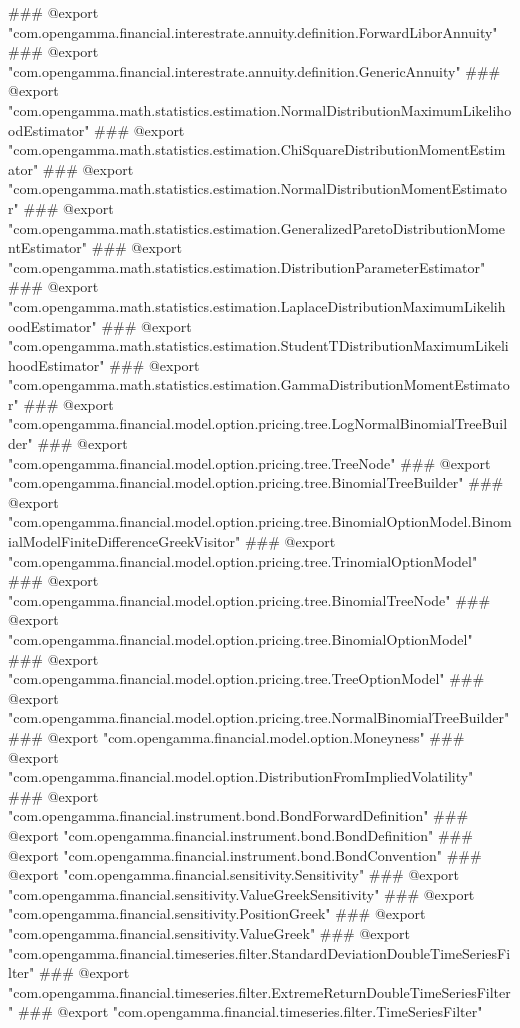 ### @export "com.opengamma.financial.interestrate.annuity.definition.ForwardLiborAnnuity"
### @export "com.opengamma.financial.interestrate.annuity.definition.GenericAnnuity"
### @export "com.opengamma.math.statistics.estimation.NormalDistributionMaximumLikelihoodEstimator"
### @export "com.opengamma.math.statistics.estimation.ChiSquareDistributionMomentEstimator"
### @export "com.opengamma.math.statistics.estimation.NormalDistributionMomentEstimator"
### @export "com.opengamma.math.statistics.estimation.GeneralizedParetoDistributionMomentEstimator"
### @export "com.opengamma.math.statistics.estimation.DistributionParameterEstimator"
### @export "com.opengamma.math.statistics.estimation.LaplaceDistributionMaximumLikelihoodEstimator"
### @export "com.opengamma.math.statistics.estimation.StudentTDistributionMaximumLikelihoodEstimator"
### @export "com.opengamma.math.statistics.estimation.GammaDistributionMomentEstimator"
### @export "com.opengamma.financial.model.option.pricing.tree.LogNormalBinomialTreeBuilder"
### @export "com.opengamma.financial.model.option.pricing.tree.TreeNode"
### @export "com.opengamma.financial.model.option.pricing.tree.BinomialTreeBuilder"
### @export "com.opengamma.financial.model.option.pricing.tree.BinomialOptionModel.BinomialModelFiniteDifferenceGreekVisitor"
### @export "com.opengamma.financial.model.option.pricing.tree.TrinomialOptionModel"
### @export "com.opengamma.financial.model.option.pricing.tree.BinomialTreeNode"
### @export "com.opengamma.financial.model.option.pricing.tree.BinomialOptionModel"
### @export "com.opengamma.financial.model.option.pricing.tree.TreeOptionModel"
### @export "com.opengamma.financial.model.option.pricing.tree.NormalBinomialTreeBuilder"
### @export "com.opengamma.financial.model.option.Moneyness"
### @export "com.opengamma.financial.model.option.DistributionFromImpliedVolatility"
### @export "com.opengamma.financial.instrument.bond.BondForwardDefinition"
### @export "com.opengamma.financial.instrument.bond.BondDefinition"
### @export "com.opengamma.financial.instrument.bond.BondConvention"
### @export "com.opengamma.financial.sensitivity.Sensitivity"
### @export "com.opengamma.financial.sensitivity.ValueGreekSensitivity"
### @export "com.opengamma.financial.sensitivity.PositionGreek"
### @export "com.opengamma.financial.sensitivity.ValueGreek"
### @export "com.opengamma.financial.timeseries.filter.StandardDeviationDoubleTimeSeriesFilter"
### @export "com.opengamma.financial.timeseries.filter.ExtremeReturnDoubleTimeSeriesFilter"
### @export "com.opengamma.financial.timeseries.filter.TimeSeriesFilter"
